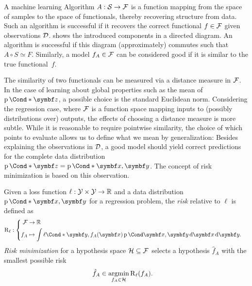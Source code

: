 A machine learning Algorithm $A : \mathcal{S} \to \mathcal{F}$ is a function mapping from the space of samples to the space of functionals, thereby recovering structure from data.
Such an algorithm is successful if it recovers the correct functional $f \in \mathcal{F}$ given observations $\mathcal{D}$.
 shows the introduced components in a directed diagram.
An algorithm is successful if this diagram (approximately) commutes such that $A \circ S \simeq F$.
Similarly, a model $f_A \in \mathcal{F}$ can be considered good if it is similar to the true functional~$f$.

The similarity of two functionals can be measured via a distance measure in $\mathcal{F}$.
In the case of learning about global properties such as the mean of $\Prob*{\mat{z}}$, a possible choice is the standard Euclidean norm.
Considering the regression case, where $\mathcal{F}$ is a function space mapping inputs to (possibly distributions over) outputs, the effects of choosing a distance measure is more subtle.
While it is reasonable to require pointwise similarity, the choice of which points to evaluate allows us to define what we mean by generalization:
Besides explaining the observations in $\mathcal{D}$, a good model should yield correct predictions for the complete data distribution $\Prob*{\mat{z}} = \Prob*{\mat{x}, \mat{y}}$.
The concept of risk minimization is based on this observation.
\begin{definition}
    \label{def:risk_minimization}
    Given a loss function $\ell: \mathcal{Y} \times \mathcal{Y} \to \mathbb{R}$ and a data distribution $\Prob*{\mat{x}, \mat{y}}$ for a regression problem, the \emph{risk} relative to $\ell$ is defined as
    \begin{align}
        \risk_\ell & : \left\{
        \begin{aligned}
            \Fc & \to \Rb                                                                                              \\
            f_A & \mapsto \int \Fun*{\ell}{\mat{y}, f_A(\mat{x})} \Prob{\mat{x}, \mat{y}} \diff \mat{x} \diff \mat{y}.
        \end{aligned}
        \right.
    \end{align}
    \emph{Risk minimization} for a hypothesis space $\mathcal{H} \subseteq \mathcal{F}$ selects a hypothesis $\hat{f}_A$ with the smallest possible risk
    \begin{align}
        \hat{f}_A & \in \operatorname*{argmin}_{f_A \in \mathcal{H}} \operatorname{R}_\ell(f_A).
    \end{align}
\end{definition}

